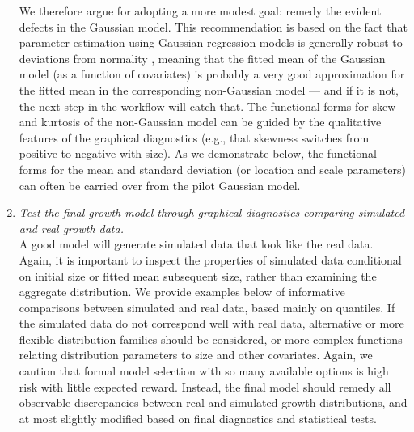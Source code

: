 \documentclass[12pt]{article}
\begin{document}
\begin{enumerate}[label=\arabic*., listparindent=1.5em]
We therefore argue for adopting a more modest goal: remedy the evident defects in the Gaussian model. 
This recommendation is based on the fact that parameter estimation using Gaussian regression models is generally robust to deviations from normality \citep{schielzeth2020robustness}, meaning that the fitted mean of the Gaussian model (as a function of covariates) is probably a very good approximation for the fitted mean in the corresponding non-Gaussian model --- and if it is not, the next step in the workflow will catch that. 
The functional forms for skew and kurtosis of the non-Gaussian model can be guided by the qualitative features of the graphical diagnostics (e.g., that skewness switches from positive to negative with size). As we demonstrate below, the functional forms for the mean and standard deviation (or location and scale parameters) can often be carried over from the pilot Gaussian model. 

\item \textit{Test the final growth model through graphical diagnostics comparing simulated and real growth data.} 
\\
A good model will generate simulated data that look like the real data.  
Again, it is important to inspect the properties of simulated data conditional on initial size or fitted mean subsequent size, rather than examining the aggregate distribution.   
We provide examples below of informative comparisons between simulated and real data, based mainly on quantiles. 
If the simulated data do not correspond well with real data, alternative or more flexible distribution families should be considered, or more complex functions relating distribution parameters to size and other covariates. 
Again, we caution that formal model selection with so many available options is high risk with little expected reward. 
Instead, the final model should remedy all observable discrepancies between real and simulated growth distributions, and at most slightly modified based on final diagnostics and statistical tests.

\end{enumerate}
\end{document}
